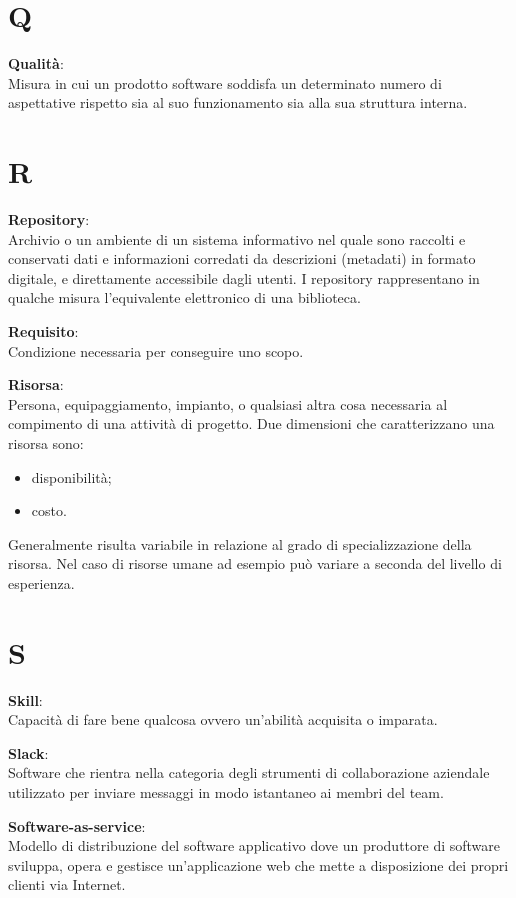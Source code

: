 \documentclass[a4paper, oneside, openany, dvipsnames, table]{article}
\begin{document}
\newpage
\section{Q}
\textbf{Qualità}:\\	Misura in cui un prodotto software soddisfa un determinato numero di aspettative rispetto sia al suo funzionamento sia alla sua struttura interna.


\newpage
\section{R}
\textbf{Repository}:\\	Archivio o un ambiente di un sistema informativo nel quale sono raccolti e conservati dati e informazioni corredati da descrizioni (metadati) in formato digitale, e direttamente accessibile dagli utenti. I repository rappresentano in qualche misura l’equivalente elettronico di una biblioteca.

\textbf{Requisito}:\\	Condizione necessaria per conseguire uno scopo.

\textbf{Risorsa}:\\	Persona, equipaggiamento, impianto, o qualsiasi altra cosa necessaria al compimento di una attività di progetto. Due dimensioni che caratterizzano una risorsa sono:
\begin{itemize}
\item disponibilità;
\item costo.
\end{itemize} 
Generalmente risulta variabile in relazione al grado di specializzazione della risorsa. Nel caso di risorse umane ad esempio può variare a seconda del livello di esperienza.


\newpage
\section{S}
\textbf{Skill}:\\	Capacità di fare bene qualcosa ovvero un'abilità acquisita o imparata.

\textbf{Slack}:\\	Software che rientra nella categoria degli strumenti di collaborazione aziendale utilizzato per inviare messaggi in modo istantaneo ai membri del team.

\textbf{Software-as-service}:\\	Modello di distribuzione del software applicativo dove un produttore di software sviluppa, opera e gestisce un'applicazione web che mette a disposizione dei propri clienti via Internet.
\end{document}

